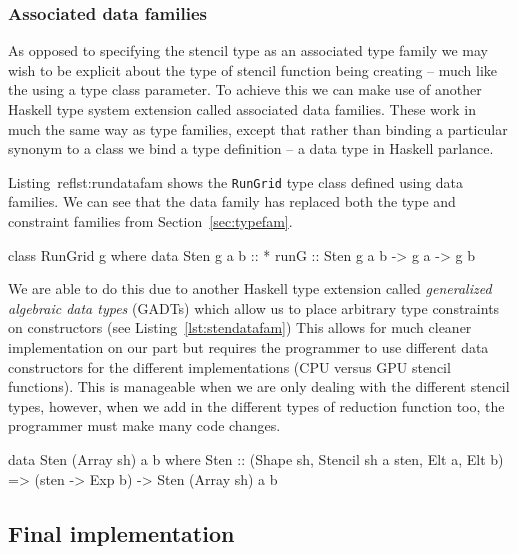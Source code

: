 \documentclass[12pt,a4paper,twoside]{scrbook}
\begin{document}
\subsubsection{Associated data families}

As opposed to specifying the stencil type as an associated type family we may
wish to be explicit about the type of stencil function being creating -- much
like the using a type class parameter. To achieve this we can make use of
another Haskell type system extension called associated data families. These
work in much the same way as type families, except that rather than binding a
particular synonym to a class we bind a type definition -- a data type in
Haskell parlance.

Listing~ref{lst:rundatafam} shows the \texttt{RunGrid} type class defined using
data families. We can see that the data family has replaced both the type and
constraint families from Section~\ref{sec:typefam}.

\begin{hflisting}[label=lst:rundatafam,
caption=RunGrid with associated data family.]
class RunGrid g where
    data Sten g a b :: *
    runG :: Sten g a b -> g a -> g b
\end{hflisting}

We are able to do this due to another Haskell type extension called
\emph{generalized algebraic data types} (GADTs) which allow us to place
arbitrary type constraints on constructors (see Listing~\ref{lst:stendatafam})
This allows for much cleaner implementation on our part but requires the
programmer to use different data constructors for the different implementations
(CPU versus GPU stencil functions). This is manageable when we are only dealing
with the different stencil types, however, when we add in the different types of
reduction function too, the programmer must make many code changes.

\begin{hflisting}[label=lst:stendatafam,
caption=An example of a stencil data type for the GPU]
data Sten (Array sh) a b where
        Sten :: (Shape sh, Stencil sh a sten,
                 Elt a, Elt b) =>
                (sten -> Exp b)
                -> Sten (Array sh) a b
\end{hflisting}

\subsection{Final implementation}
\label{sec:final}
\end{document}
